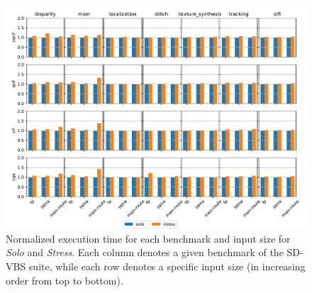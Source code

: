 \begin{figure}
    \centering
    \includegraphics[scale=0.54]{images/Execution_times_no_ts.pdf}
    \caption{Normalized execution time for each benchmark and input size for \emph{Solo} and \emph{Stress}. Each column denotes a given benchmark of the SD-VBS suite, while each row denotes a specific input size (in increasing order from top to bottom).}
    \label{fig:isolation_ratio}
\end{figure}
